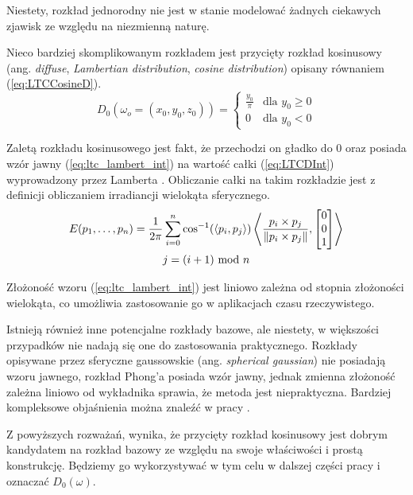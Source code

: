 \documentclass[../main.tex]{subfiles}
\begin{document}
Niestety, rozkład jednorodny nie jest w stanie modelować żadnych ciekawych zjawisk ze względu na niezmienną naturę.

Nieco bardziej skomplikowanym rozkładem jest przycięty rozkład kosinusowy (ang. \textit{diffuse}, \textit{Lambertian distribution}, \textit{cosine distribution}) opisany równaniem (\ref{eq:LTCCosineD}).
\begin{equation}
D_0(\omega_o=(x_0, y_0, z_0)) = \begin{cases}
  \frac{y_0}{\pi} & \text{dla } y_0 \geq 0 \\
  0 & \text{dla } y_0 < 0
\end{cases}
\label{eq:LTCCosineD}
\end{equation}

Zaletą rozkładu kosinusowego jest fakt, że przechodzi on gładko do $0$ oraz posiada wzór jawny (\ref{eq:ltc_lambert_int}) na wartość całki (\ref{eq:LTCDInt}) wyprowadzony przez Lamberta \cite{Baum}. Obliczanie całki na takim rozkładzie jest z definicji obliczaniem irradiancji wielokąta sferycznego.
\begin{equation}
\begin{gathered}
E(p_1, \ldots, p_n) =
\frac{1}{2\pi}
\sum_{i=0}^{n} {
  \cos^{-1}(\langle p_i, p_j \rangle)
  \left\langle {
    \frac{p_i \times p_j}{\norm{p_i \times p_j}},
    \left[ \begin{matrix} 0 \\ 0 \\ 1 \end{matrix} \right]
  } \right\rangle
} \\
j = (i+1) \text{ mod } n
\end{gathered}
\label{eq:ltc_lambert_int}
\end{equation}

Złożoność wzoru (\ref{eq:ltc_lambert_int}) jest liniowo zależna od stopnia złożoności wielokąta, co umożliwia zastosowanie go w aplikacjach czasu rzeczywistego.

Istnieją również inne potencjalne rozkłady bazowe, ale niestety, w większości przypadków nie nadają się one do zastosowania praktycznego. Rozkłady opisywane przez sferyczne gaussowskie (ang. \textit{spherical gaussian}) nie posiadają wzoru jawnego, rozkład Phong’a posiada wzór jawny, jednak zmienna złożoność zależna liniowo od wykładnika sprawia, że metoda jest niepraktyczna. Bardziej kompleksowe objaśnienia można znaleźć w pracy \cite{ltc_heitz}.

Z powyższych rozważań, wynika, że przycięty rozkład kosinusowy jest dobrym kandydatem na rozkład bazowy ze względu na swoje właściwości i prostą konstrukcję. Będziemy go wykorzystywać w tym celu w dalszej części pracy i oznaczać $D_0(\omega)$.
\end{document}
